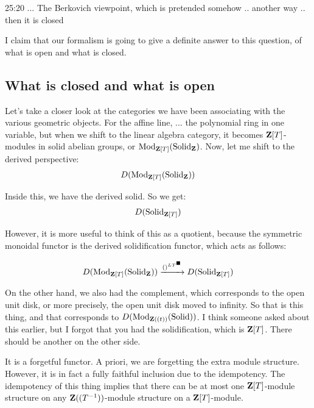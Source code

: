 \begin{unfinished}{25:20}
\ques ... The Berkovich viewpoint, which is pretended somehow .. another way .. then it is closed 

\ans I claim that our formalism is  going to give a definite answer to this question, of what is open and what is closed.

\subsection{What is closed and what is open}

Let's take a closer look at the categories we have been associating with the various geometric objects. For the affine line, ... the polynomial ring in one variable, but when we shift to the linear algebra category, it becomes $\mathbf Z[T]$-modules in solid abelian groups, or $\operatorname{Mod}_{\mathbf Z[T]}(\mathrm{Solid}_\mathbf Z)$. 
Now, let me shift to the derived perspective:
\begin{align*}
D(\operatorname{Mod}_{\mathbf Z[T]}(\mathrm{Solid}_\mathbf Z))
\end{align*}

Inside this, we have the derived solid. So we get:
\begin{align*}
D(\mathrm{Solid}_{\mathbf Z[T]})
\end{align*}

However, it is more useful to think of this as a quotient, because the symmetric monoidal functor is the derived solidification functor,  which acts as follows:

\begin{align*}
D(\operatorname{Mod}_{\mathbf Z[T]}(\mathrm{Solid}_\mathbf Z)) \xrightarrow{ ()^{LT^\blacksquare} } D(\mathrm{Solid}_{\mathbf Z[T]})
\end{align*}

On the other hand, we also had the complement, which corresponds to the open unit disk, or more precisely, the open unit disk moved to infinity. 
So that is this thing, and that corresponds to $D(\operatorname{Mod}_{\mathbf Z((t))} (\mathrm{Solid}) )$.
% 
I think someone asked about this earlier, but I forgot that you had the solidification, which is $\mathbf Z[T]$. There should be another on the other side.

It is a forgetful functor. A priori, we are forgetting the extra module structure. However, it is in fact a fully faithful inclusion due to the idempotency. The idempotency of this thing implies that there can be at most one $\mathbf Z[T]$-module structure on any $\mathbf Z((T^{-1}))$-module structure on a $\mathbf Z[T]$-module.


\end{unfinished}
